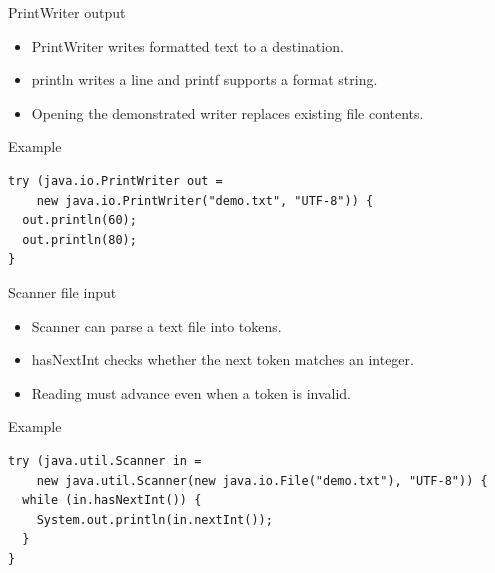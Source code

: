 \documentclass[10pt,aspectratio=169]{beamer}
\begin{document}
\begin{frame}[fragile,t]{PrintWriter output}
\begin{itemize}
\item PrintWriter writes formatted text to a destination.
\item println writes a line and printf supports a format string.
\item Opening the demonstrated writer replaces existing file contents.
\end{itemize}
\vspace{1mm}\begin{block}{Example}
\begin{lstlisting}
try (java.io.PrintWriter out =
    new java.io.PrintWriter("demo.txt", "UTF-8")) {
  out.println(60);
  out.println(80);
}
\end{lstlisting}
\end{block}
\end{frame}

\begin{frame}[fragile,t]{Scanner file input}
\begin{itemize}
\item Scanner can parse a text file into tokens.
\item hasNextInt checks whether the next token matches an integer.
\item Reading must advance even when a token is invalid.
\end{itemize}
\vspace{1mm}\begin{block}{Example}
\begin{lstlisting}
try (java.util.Scanner in =
    new java.util.Scanner(new java.io.File("demo.txt"), "UTF-8")) {
  while (in.hasNextInt()) {
    System.out.println(in.nextInt());
  }
}
\end{lstlisting}
\end{block}
\end{frame}
\end{document}

